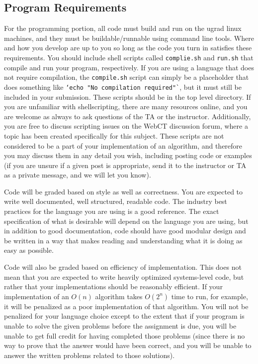 \documentclass[12pt]{article}
\newcommand{\ttt}[1]{\texttt{#1}}
\begin{document}
\subsection{Program Requirements}
For the programming portion, all code must build and run on the ugrad linux
machines, and they must be buildable/runnable using command line tools.  Where
and how you develop are up to you so long as the code you turn in satisfies
these requirements.  You should include shell scripts called
\ttt{complie.sh} and \ttt{run.sh} that compile and run your program,
respectively.  If you are using a language that does not require compilation,
the \ttt{compile.sh} script can simply be a placeholder that does something like
\ttt{`echo "No compilation required"`}, but it must still be included in your
submission.  These scripts should be in the top level directory.  If you are
unfamiliar with shellscripting, there are many resources online, and you are
welcome as always to ask questions of the TA or the instructor.  Additionally,
you are free to discuss scripting issues on the WebCT discussion forum, where a
topic has been created specifically for this subject.  These scripts are not
considered to be a part of your implementation of an algorithm, and therefore
you may discuss them in any detail you wish, including posting code or examples
(if you are unsure if a given post is appropriate, send it to the instructor or
TA as a private message, and we will let you know).

Code will be graded based on style as well as correctness.  You are expected to
write well documented, well structured, readable code.  The industry best
practices for the language you are using is a good reference.  The exact
specification of what is desirable will depend on the language you are using,
but in addition to good documentation, code should have good modular design and
be written in a way that makes reading and understanding what it is doing as
easy as possible.

Code will also be graded based on efficiency of implementation.  This does not
mean that you are expected to write heavily optimized systems-level code, but
rather that your implementations should be reasonably efficient.  If your
implementation of an $O(n)$ algorithm takes $O(2^n)$ time to run, for example,
it will be penalized as a poor implementation of that algorithm.  You will not
be penalized for your language choice except to the extent that if your program
is unable to solve the given problems before the assignment is due, you will be
unable to get full credit for having completed those problems (since there is no
way to prove that the answer would have been correct, and you will be unable to
answer the written problems related to those solutions).
\end{document}
